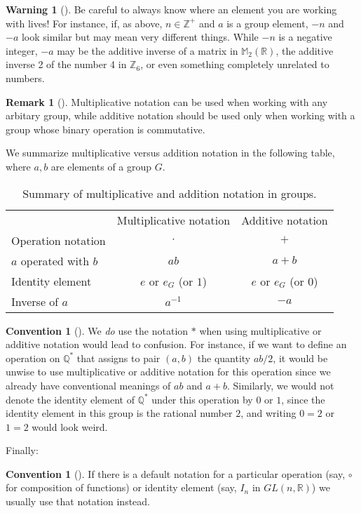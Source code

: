 \documentclass[10pt,]{book}
\theoremstyle{plain}
\theoremstyle{definition}
\theoremstyle{definition}
\newtheorem{remark}[theorem]{Remark}
\newtheorem{convention}[theorem]{Convention}
\newtheorem{warning}[theorem]{Warning}
\theoremstyle{definition}
\theoremstyle{definition}
\numberwithin{equation}{section}
\newcommand{\hrulemedium}{\noalign{\hrule height 0.07em}}
\def\Z{\mathbb{Z}}
\def\R{\mathbb{R}}
\def\Q{\mathbb{Q}}
\def\M{\mathbb{M}}
\begin{document}
\begin{warning}[]\label{warning-7}
Be careful to always know where an element you are working with lives! For instance, if, as above, \(n\in
\Z^+\) and \(a\) is a group element, \(-n\) and \(-a\) look similar but may mean very different things. While \(-n\) is a negative integer, \(-a\) may be the additive inverse of a matrix in \(\M_2(\R)\), the additive inverse 2 of the number 4 in \(\Z_6\), or even something completely unrelated to numbers.%
\end{warning}
\begin{remark}[]\label{remark-9}
Multiplicative notation can be used when working with any arbitary group, while additive notation should be used only when working with a group whose binary operation is commutative.%
\end{remark}
We summarize multiplicative versus addition notation in the following table, where \(a,b\) are elements of a group \(G\).%
\begin{table}
\centering
\begin{tabular}{lll}
\multicolumn{1}{c}{}&\multicolumn{1}{c}{Multiplicative notation}&\multicolumn{1}{c}{Additive notation}\tabularnewline\hrulemedium
Operation notation&\multicolumn{1}{c}{\(\cdot\)}&\multicolumn{1}{c}{\(+\)}\tabularnewline[0pt]
\(a\) operated with \(b\)&\multicolumn{1}{c}{\(ab\)}&\multicolumn{1}{c}{\(a+b\)}\tabularnewline[0pt]
Identity element&\multicolumn{1}{c}{\(e\) or \(e_G\) (or \(1\))}&\multicolumn{1}{c}{\(e\) or \(e_G\) (or \(0\))}\tabularnewline[0pt]
Inverse of \(a\)&\multicolumn{1}{c}{\(a^{-1}\)}&\multicolumn{1}{c}{\(-a\)}
\end{tabular}
\caption{Summary of multiplicative and addition notation in groups.\label{table-1}}
\end{table}
\begin{convention}[]\label{convention-2}
We \emph{do} use the notation \(*\) when using multiplicative or additive notation would lead to confusion. For instance, if we want to define an operation on \(\Q^*\) that assigns to pair \((a,b)\) the quantity \(ab/2\), it would be unwise to use multiplicative or additive notation for this operation since we already have conventional meanings of \(ab\) and \(a+b\). Similarly, we would not denote the identity element of \(\Q^*\) under this operation by \(0\) or \(1\), since the identity element in this group is the rational number \(2\), and writing \(0=2\) or \(1=2\) would look weird.%
\end{convention}
Finally:%
\begin{convention}[]\label{convention-3}
If there is a default notation for a particular operation (say, \(\circ\) for composition of functions) or identity element (say, \(I_n\) in \(GL(n,\R)\)) we usually use that notation instead.%
\end{convention}
\typeout{************************************************}
\typeout{************************************************}
\end{document}
